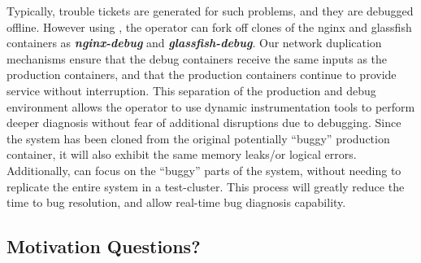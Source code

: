 Typically, trouble tickets are generated for such problems, and they are debugged offline.
However using \parikshan, the operator can fork off clones of the nginx and glassfish containers as \textbf{\textit{nginx-debug}} and \textbf{\textit{glassfish-debug}}.
Our network duplication mechanisms ensure that the debug containers receive the same inputs as the production containers, and that the production containers continue to provide service without interruption.
This separation of the production and debug environment allows the operator to use dynamic instrumentation tools to perform deeper diagnosis without fear of additional disruptions due to debugging.
Since the system has been cloned from the original potentially ``buggy'' production container, it will also exhibit the same memory leaks/or logical errors.
Additionally, \parikshan can focus on the ``buggy'' parts of the system, without needing to replicate the entire system in a test-cluster.
This process will greatly reduce the time to bug resolution, and allow real-time bug diagnosis capability.


\iffalse
\subsection{Motivation Questions?}

